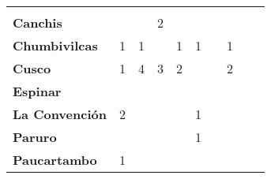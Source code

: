 \begin{tabular}{lccccccccc}
	&\cellcolor[HTML]{FCC46C} 					&\cellcolor[HTML]{FCC46C}\\
	\textbf{Canchis}                            
	&\cellcolor[HTML]{FCC46C}                   &\cellcolor[HTML]{FCC46C}                   &2         &\cellcolor[HTML]{FCC46C}                	&\cellcolor[HTML]{FCC46C}              &\cellcolor[HTML]{FCC46C} 		  			&\cellcolor[HTML]{FCC46C} 
	&\cellcolor[HTML]{FCC46C}   				&\cellcolor[HTML]{FCC46C}\\
	\textbf{Chumbivilcas}                      
	&1                   &1                    						&\cellcolor[HTML]{FCC46C}                               &1                  						&1            								&\cellcolor[HTML]{FCC46C}   			    &1 
	&\cellcolor[HTML]{FCC46C}					&\cellcolor[HTML]{FCC46C}\\
	\textbf{Cusco}                             
	&1                    				        &4                                          &3                    			 			&2                  
	&\cellcolor[HTML]{FCC46C}                   &\cellcolor[HTML]{FCC46C}    	 
	&2 											&\cellcolor[HTML]{FCC46C} 		 &\cellcolor[HTML]{FCC46C}\\
	\textbf{Espinar}       					                 						   
	&\cellcolor[HTML]{FCC46C}                   &\cellcolor[HTML]{FCC46C}        &\cellcolor[HTML]{FCC46C}                   &\cellcolor[HTML]{FCC46C}                   &\cellcolor[HTML]{FCC46C}  		 &\cellcolor[HTML]{FCC46C} 
	&\cellcolor[HTML]{FCC46C} 					&\cellcolor[HTML]{FCC46C} 		 &\cellcolor[HTML]{FCC46C}\\
	\textbf{La Convención}                                                   			&2                     					    &\cellcolor[HTML]{FCC46C}                   &\cellcolor[HTML]{FCC46C}                   &\cellcolor[HTML]{FCC46C}                   &1              							&\cellcolor[HTML]{FCC46C} 					&\cellcolor[HTML]{FCC46C}
	&\cellcolor[HTML]{FCC46C}  					&\cellcolor[HTML]{FCC46C} \\
	\textbf{Paruro}                            
	&\cellcolor[HTML]{FCC46C}       	 		&\cellcolor[HTML]{FCC46C}              	    &\cellcolor[HTML]{FCC46C}                   &\cellcolor[HTML]{FCC46C}              	    
	&1        
	&\cellcolor[HTML]{FCC46C}                   &\cellcolor[HTML]{FCC46C}   				
	&\cellcolor[HTML]{FCC46C} 					&\cellcolor[HTML]{FCC46C}      \\
	\textbf{Paucartambo}               		   
	&1                      
	&\cellcolor[HTML]{FCC46C}                   &\cellcolor[HTML]{FCC46C}       &\cellcolor[HTML]{FCC46C}                      

\end{tabular}
